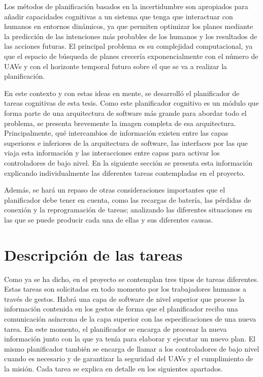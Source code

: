 \documentclass[fontsize=11pt, English=false, Español=true, Myfinal=true, twoside, numbers=noenddot]{scrbook}
\begin{document}
Los métodos de planificación basados en la incertidumbre son apropiados para añadir capacidades cognitivas a un sistema que tenga que interactuar con humanos en entornos dinámicos, ya que permiten optimizar los planes mediante la predicción de las intenciones más probables de los humanos y los resultados de las acciones futuras. El principal problema es su complejidad computacional, ya que el espacio de búsqueda de planes crecería exponencialmente con el número de \glspl{UAV} y con el horizonte temporal futuro sobre el que se va a realizar la planificación.

En este contexto y con estas ideas en mente, se desarrolló el planificador de tareas cognitivas de esta tesis. Como este planificador cognitivo es un módulo que forma parte de una arquitectura de software más grande para abordar todo el problema, se presenta brevemente la imagen completa de esa arquitectura. Principalmente, qué intercambios de información existen entre las capas superiores e inferiores de la arquitectura de software, las interfaces por las que viaja esta información y las interacciones entre capas para activar los controladores de bajo nivel. En la siguiente sección se presenta esta información explicando individualmente las diferentes tareas contempladas en el proyecto. 

Además, se hará un repaso de otras consideraciones importantes que el planificador debe tener en cuenta, como las recargas de batería, las pérdidas de conexión y la reprogramación de tareas; analizando las diferentes situaciones en las que se puede producir cada una de ellas y sus diferentes causas. 

\section{Descripción de las tareas}
\label{sec:DescriptionOfTasks}
Como ya se ha dicho, en el proyecto se contemplan tres tipos de tareas diferentes. Estas tareas son solicitadas en todo momento por los trabajadores humanos a través de gestos. Habrá una capa de software de nivel superior que procese la información contenida en los gestos de forma que el planificador reciba una comunicación asíncrona de la capa superior con las especificaciones de una nueva tarea. En este momento, el planificador se encarga de procesar la nueva información junto con la que ya tenía para elaborar y ejecutar un nuevo plan. El mismo planificador también se encarga de llamar a los controladores de bajo nivel cuando es necesario y de garantizar la seguridad del \glspl{UAV} y el cumplimiento de la misión. Cada tarea se explica en detalle en los siguientes apartados.
\end{document}
